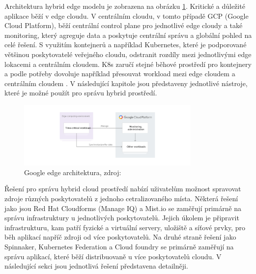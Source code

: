 	Architektura hybrid edge modelu je zobrazena na obrázku \ref{fig:edge}. Kritické a důležité aplikace běží v edge cloudu. V centrálním cloudu, v tomto případě GCP (Google Cloud Platform), běží centrální control plane pro jednotlivé edge cloudy a také monitoring, který agreguje data a poskytuje centrální správu a globální pohled na celé řešení. S využitím kontejnerů a například Kubernetes, které je podporované většinou poskytovatelé veřejného cloudu, odstranit rozdíly mezi jednotlivými edge lokacemi a centrálním cloudem. K8s zaručí stejné běhové prostředí pro kontejnery a podle potřeby dovoluje například přesouvat workload mezi edge cloudem a centrálním cloudem \cite{google-edge}. V následující kapitole jsou představeny jednotlivé nástroje, které je možné použít pro správu hybrid prostředí.
\par

\begin{figure}[H]
  \begin{centering}
	  \includegraphics[width=0.8\textwidth]{images/edge.jpg}
    \par
	  \caption{Google edge architektura\label{fig:edge}, zdroj: }
    \end{centering}
\end{figure}

Řešení pro správu hybrid cloud prostředí nabízí uživatelům možnost spravovat zdroje různých poskytovatelů z jednoho cetralizovaného místa. Některá řešení jako jsou Red Hat Cloudforms (Manage IQ) a Mist.io se zaměřují primárně na správu infrastruktury u jednotlivých poskytovatelů. Jejich úkolem je připravit infrastrukturu, kam patří fyzické a virtuální servery, uložiště a síťové prvky, pro běh aplikací napříč zdroji \linebreak od více poskytovatelů. Na druhé straně řešení jako Spinnaker, Kubernetes Federation a Cloud foundry se primárně zaměřují na správu aplikací, které běží distribuovaně u více poskytovatelů cloudu. V následující sekci jsou jednotlivá řešení představena detailněji. 


